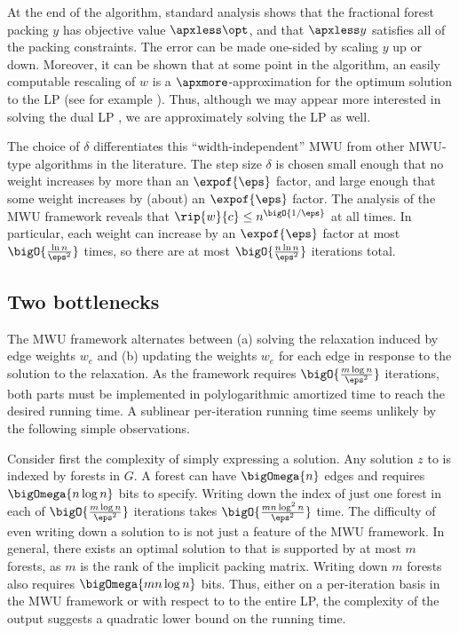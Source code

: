 \documentclass[11pt]{article}
\numberwithin{equation}{section}
\theoremstyle{definition}
\theoremstyle{plain}
\newcommand{\cost}{c} %
\providecommand{\capacity}{\cost} %
\newcommand{\weight}[1]{w_{#1}}
\newcommand{\weightv}{w}%
\newcommand{\wrt}{with respect to\xspace} %
\begin{document}
At the end of the algorithm, standard analysis shows that the
fractional forest packing $y$ has objective value $\apxless \opt$, and
that $\apxless y$ satisfies all of the packing constraints. The error
can be made one-sided by scaling $y$ up or down. Moreover, it can be
shown that at some point in the algorithm, an easily computable
rescaling of $w$ is a
%
$\apxmore$-approximation %
for the %
optimum solution to the %
LP  (see for example 
%
\cite{gk-07,cq-17-focs}).   %
Thus, although we may appear more interested in solving the dual LP
, we are %
approximately solving %
the %
LP  as well.

The choice of $\delta$ differentiates this ``width-independent'' MWU
from other MWU-type algorithms in the literature. The step size
$\delta$ is chosen small enough that no weight increases by more than
an
%
$\expof{\eps}$ factor,  %
and large enough that some
weight increases by (about) an
%
$\expof{\eps}$ factor.   %
The analysis of the MWU framework reveals that
\begin{math}
  \rip{\weightv}{\capacity} \leq n^{\bigO{1/\eps}}
\end{math}
at all times. In particular, each weight can increase by an
%
$\expof{\eps}$ factor  %
at most $\bigO{\frac{\ln n}{\eps^2}}$ times, so there are at most
\begin{math}
  \bigO{\frac{n \ln n}{\eps^2}}
\end{math}
iterations total.


\subsection{Two bottlenecks}

The MWU framework alternates between (a) solving the relaxation
 induced by edge weights $\weight{e}$ and (b)
updating the weights $\weight{e}$ for each edge in response to the
solution to the relaxation. As the framework requires
$\bigO{\frac{m \log n}{\eps^2}}$ iterations, both parts must be
implemented in polylogarithmic amortized time to reach the desired
running time. A sublinear per-iteration running time seems unlikely by
the following simple observations.

Consider first the complexity of simply expressing a solution.  Any
solution $z$ to  is indexed by forests in
$G$. A forest can have $\bigOmega{n}$ edges and requires
$\bigOmega{n \log n}$ bits to specify. Writing down the index of just
one forest in each of $\bigO{\frac{m \log n}{\eps^2}}$ iterations
takes $\bigO{\frac{m n \log^2 n}{\eps^2}}$ time.  The difficulty of
even writing down a solution to  is not
just a feature of the MWU framework. In general, there exists an
optimal solution to  that is supported by
at most $m$ forests, as $m$ is the rank of the implicit packing
matrix. Writing down $m$ forests also requires $\bigOmega{m n \log n}$
bits.  Thus, either on a per-iteration basis in the MWU framework or
\wrt to the entire LP, the complexity of the output suggests a
quadratic lower bound on the running time.
\end{document}
